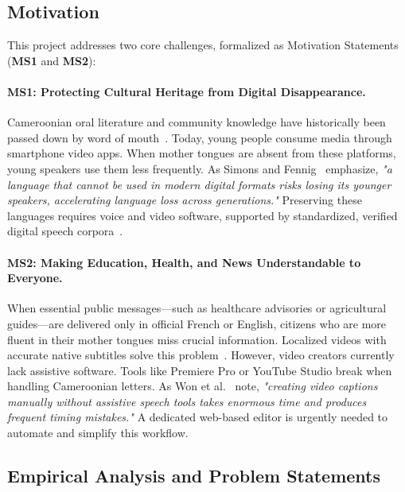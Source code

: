 \documentclass[a4paper,11pt]{article}
\begin{document}
\subsection{Motivation}
\label{sec:intro:motivation}

This project addresses two core challenges, formalized as Motivation Statements (\textbf{MS1} and \textbf{MS2}):

\paragraph{\textbf{MS1: Protecting Cultural Heritage from Digital Disappearance.}}
Cameroonian oral literature and community knowledge have historically been passed down by word of mouth~\cite{grenoble2010language}. Today, young people consume media through smartphone video apps. When mother tongues are absent from these platforms, young speakers use them less frequently. As Simons and Fennig~\cite{simons2020building} emphasize, \textit{"a language that cannot be used in modern digital formats risks losing its younger speakers, accelerating language loss across generations."} Preserving these languages requires voice and video software, supported by standardized, verified digital speech corpora~\cite{adelani2022masakhaner}.

\paragraph{\textbf{MS2: Making Education, Health, and News Understandable to Everyone.}}
When essential public messages—such as healthcare advisories or agricultural guides—are delivered only in official French or English, citizens who are more fluent in their mother tongues miss crucial information. Localized videos with accurate native subtitles solve this problem~\cite{bigioi2023multilingual}. However, video creators currently lack assistive software. Tools like Premiere Pro or YouTube Studio break when handling Cameroonian letters. As Won et al.~\cite{won2025endtoend} note, \textit{"creating video captions manually without assistive speech tools takes enormous time and produces frequent timing mistakes."} A dedicated web-based editor is urgently needed to automate and simplify this workflow.

\subsection{Empirical Analysis and Problem Statements}
\label{sec:intro:problem}
\end{document}
